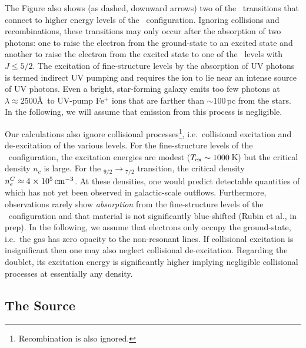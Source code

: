 \documentclass[12pt,preprint]{aastex}
\begin{document}
The Figure also shows (as dashed, downward arrows) two of the
\feiis\ transitions that connect to higher energy levels of the \zconfig\
configuration.  Ignoring collisions and recombinations, these
transitions may only occur after the absorption
of two photons: one to raise the electron from the ground-state to an
excited state and another to raise the electron from the excited state
to one of the \zconfig\ levels with $J \le 5/2$.  The excitation of
fine-structure levels by 
the absorption of UV photons is termed indirect UV pumping
\citep[e.g][]{silva02,pcb06} and requires the ion to lie
near an intense source of UV photons.  
Even a bright, star-forming galaxy emits too few photons at $\lambda
\approx 2500$\AA\ to UV-pump Fe$^+$ ions that are farther than $\sim
100$\,pc from the stars.
In the
following, we will assume that emission from this process is
negligible.

Our calculations also ignore collisional
processes\footnote{Recombination is also ignored.}, i.e.\ collisional
excitation and de-excitation of the various levels.  For the
fine-structure levels of the \aconfig\ configuration, the excitation
energies are modest ($T_{\rm ex} \sim 1000$\,K) but the critical
density $n_c$ is large.  For the \aconfig$_{9/2} \to
$\aconfig$_{7/2}$ transition, the critical density $n_e^C \approx 4
{\; \times \; 10^{5}} \, {\rm cm^{-3}}$.  At these densities, one would predict  
detectable quantities of  which has not yet been observed
in galactic-scale outflows. Furthermore, observations rarely show
{\it absorption} from the
fine-structure levels of the \aconfig\ configuration and that material
is not significantly blue-shifted (Rubin et al., in prep). 
In the following, we assume that electrons only occupy the
ground-state, i.e.\ the gas has zero opacity to the non-resonant
lines.  If collisional excitation is insignificant 
then one may also neglect collisional de-excitation.  
Regarding the  doublet, its
excitation energy is significantly higher implying 
negligible collisional processes at essentially any density.

\subsection{The Source}
\end{document}
